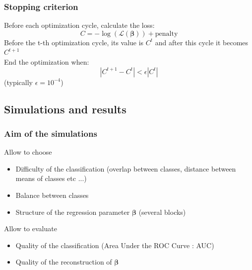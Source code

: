 \documentclass{beamer}
\begin{document}
\begin{frame}
    \frametitle{Stopping criterion}
    Before each optimization cycle, calculate the loss:
    $$C= - \log(\mathcal{L}(\bm{\beta})) + \text{penalty}$$
    Before the t-th optimization cycle, its value is $C^{t}$ and after this cycle it becomes $C^{t + 1}$\\[5 pt]
    End the optimization when:
    $$ |C^{t + 1} - C^t| < \epsilon |C^t|$$
    (typically $\epsilon = 10^{-4}$)
\end{frame}




\begin{frame}
    \section{Simulations and results}    
\end{frame}

\begin{frame}
    \frametitle{Aim of the simulations}
    Allow to choose 
    \begin{itemize}
        \item Difficulty of the classification (overlap between classes, distance between means of classes etc ...)\\[6 pt]
        \item Balance between classes\\[6 pt]
        \item Structure of the regression parameter $\bm{\beta}$ (several blocks)\\[12 pt] 
    \end{itemize}
    Allow to evaluate
    \begin{itemize}
    \item Quality of the classification (Area Under the ROC Curve : AUC)\\[6 pt]
    \item Quality of the reconstruction of $\bm{\beta}$ \nocite{picto}
    \end{itemize}
\end{frame}
\end{document}

